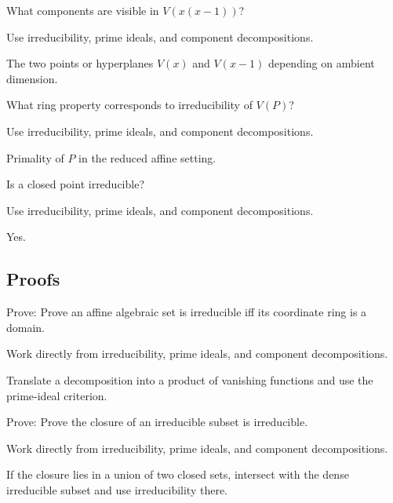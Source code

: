 \begin{exercise}\label{exr:vi05-expand-03}
What components are visible in $V(x(x-1))$?
\end{exercise}
\begin{hint}
Use irreducibility, prime ideals, and component decompositions.
\end{hint}
\begin{solution}
The two points or hyperplanes $V(x)$ and $V(x-1)$ depending on ambient dimension.
\end{solution}

\begin{exercise}\label{exr:vi05-expand-04}
What ring property corresponds to irreducibility of $V(P)$?
\end{exercise}
\begin{hint}
Use irreducibility, prime ideals, and component decompositions.
\end{hint}
\begin{solution}
Primality of $P$ in the reduced affine setting.
\end{solution}

\begin{exercise}[Point]\label{exr:vi05-expand-05}
Is a closed point irreducible?
\end{exercise}
\begin{hint}
Use irreducibility, prime ideals, and component decompositions.
\end{hint}
\begin{solution}
Yes.
\end{solution}

\subsection*{Proofs}

\begin{exercise}\label{exr:vi05-expand-06}
Prove: Prove an affine algebraic set is irreducible iff its coordinate ring is a domain.
\end{exercise}
\begin{hint}
Work directly from irreducibility, prime ideals, and component decompositions.
\end{hint}
\begin{solution}
Translate a decomposition into a product of vanishing functions and use the prime-ideal criterion.
\end{solution}

\begin{exercise}\label{exr:vi05-expand-07}
Prove: Prove the closure of an irreducible subset is irreducible.
\end{exercise}
\begin{hint}
Work directly from irreducibility, prime ideals, and component decompositions.
\end{hint}
\begin{solution}
If the closure lies in a union of two closed sets, intersect with the dense irreducible subset and use irreducibility there.
\end{solution}

